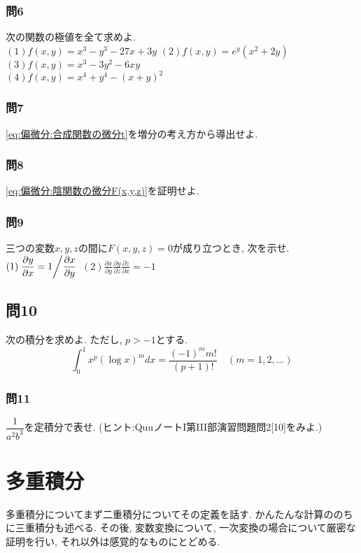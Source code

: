     \subsubsection*{問6}次の関数の極値を全て求めよ.\\
        $(1)f(x,y)=x^3-y^3-27x+3y$\hspace{1mm}
        $(2)f(x,y)=e^{y}(x^2+2y)$\hspace{1mm}
        $(3)f(x,y)=x^3-3y^2-6xy$\\
        $(4)f(x,y)=x^4+y^4-(x+y)^2$

    \subsubsection*{問7}\eqref{eq:偏微分:合成関数の微分t}を増分の考え方から導出せよ.

    \subsubsection*{問8}\eqref{eq:偏微分:陰関数の微分F(x,y,z)}を証明せよ.
    \clearpage
    \thispagestyle{fancy}\rhead{\thepage}\cfoot{}
    \subsubsection*{問9}三つの変数$x,y,z$の間に$F(x,y,z)=0$が成り立つとき, 次を示せ.\\
    $(1)\displaystyle \left.\frac{\partial y}{\partial x}=1\middle/ \frac{\partial x}{\partial y}\right.$\hspace{20mm}
    $(2)\displaystyle \frac{\partial x}{\partial y}\frac{\partial y}{\partial z}\frac{\partial z}{\partial x} = -1$

    \subsection*{問10}次の積分を求めよ. ただし, $p>-1$とする.
    \begin{equation*}
        \int_{0}^{1}x^p(\log x)^mdx=\frac{(-1)^mm!}{(p+1)!}\quad (m=1,2,\dots)
    \end{equation*}
    
    \subsubsection*{問11} $\dfrac{1}{a^2b^3}$を定積分で表せ. ({\footnotesize ヒント:QuuノートI第III部演習問題問2[10]をみよ.})
\clearpage
\section{多重積分}
    多重積分についてまず二重積分についてその定義を話す. かんたんな計算ののちに三重積分も述べる. その後, 変数変換について, 一次変換の場合について厳密な証明を行い, 
    それ以外は感覚的なものにとどめる.
